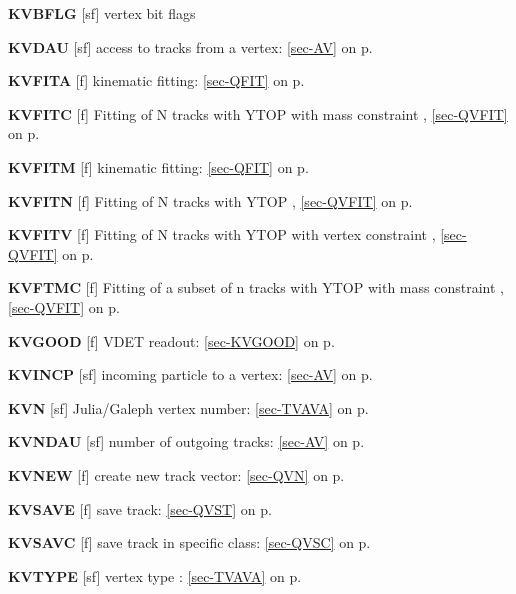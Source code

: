  \item{\bf KVBFLG  }[sf] vertex bit flags\\
 \item{\bf KVDAU   }[sf] access to tracks from a vertex: \ref{sec-AV} on p.~\pageref{sec-AV}\\
 \item{\bf KVFITA  }[f] kinematic fitting: \ref{sec-QFIT} on p.~\pageref{sec-QFIT}\\
 \item{\bf KVFITC  }[f] Fitting of N tracks with YTOP with mass constraint ,
 \ref{sec-QVFIT} on p.~\pageref{sec-QVFIT}\\
 \item{\bf KVFITM  }[f] kinematic fitting: \ref{sec-QFIT} on p.~\pageref{sec-QFIT}\\
 \item{\bf KVFITN  }[f] Fitting of N tracks with YTOP ,
 \ref{sec-QVFIT} on p.~\pageref{sec-QVFIT}\\
 \item{\bf KVFITV  }[f] Fitting of N tracks with YTOP with vertex constraint ,
 \ref{sec-QVFIT} on p.~\pageref{sec-QVFIT}\\
 \item{\bf KVFTMC  }[f] Fitting of a subset of n tracks with YTOP with mass constraint ,
 \ref{sec-QVFIT} on p.~\pageref{sec-QVFIT}\\
 \item{\bf KVGOOD  }[f] VDET readout: \ref{sec-KVGOOD} on p.~\pageref{sec-KVGOOD}\\
 \item{\bf KVINCP  }[sf] incoming particle to a vertex: \ref{sec-AV} on p.~\pageref{sec-AV}\\
 \item{\bf KVN     }[sf] Julia/Galeph vertex number: \ref{sec-TVAVA} on p.~\pageref{sec-TVAVA}\\
 \item{\bf KVNDAU  }[sf] number of outgoing tracks: \ref{sec-AV} on p.~\pageref{sec-AV}\\
 \item{\bf KVNEW   }[f] create new track vector: \ref{sec-QVN} on p.~\pageref{sec-QVN}\\
 \item{\bf KVSAVE  }[f] save track: \ref{sec-QVST} on p.~\pageref{sec-QVST}\\
 \item{\bf KVSAVC  }[f] save track in specific class:
 \ref{sec-QVSC} on p.~\pageref{sec-QVSC}\\
 \item{\bf KVTYPE  }[sf] vertex type : \ref{sec-TVAVA} on p.~\pageref{sec-TVAVA}
 
